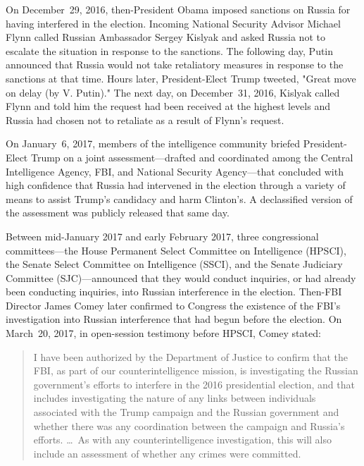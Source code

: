 On December~29, 2016, then-President Obama imposed sanctions on Russia for having interfered in the election.
Incoming National Security Advisor Michael Flynn called Russian Ambassador Sergey Kislyak and asked Russia not to escalate the situation in response to the sanctions.
The following day, Putin announced that Russia would not take retaliatory measures in response to the sanctions at that time.
Hours later, President-Elect Trump tweeted, "Great move on delay (by V. Putin)."
The next day, on December~31, 2016, Kislyak called Flynn and told him the request had been received at the highest levels and Russia had chosen not to retaliate as a result of Flynn's request.

\hr

On January~6, 2017, members of the intelligence community briefed President-Elect Trump on a joint assessment---drafted and coordinated among the Central Intelligence Agency, FBI, and National Security Agency---that concluded with high confidence that Russia had intervened in the election through a variety of means to assist Trump's candidacy and harm Clinton's.
A declassified version of the assessment was publicly released that same day.

Between mid-January 2017 and early February 2017, three congressional committees---the House Permanent Select Committee on Intelligence (HPSCI), the Senate Select Committee on Intelligence (SSCI), and the Senate Judiciary Committee (SJC)---announced that they would conduct inquiries, or had already been conducting inquiries, into Russian interference in the election.
Then-FBI Director James Comey later confirmed to Congress the existence of the FBI's investigation into Russian interference that had begun before the election.
On March~20, 2017, in open-session testimony before HPSCI, Comey stated:

\begin{quote}
I have been authorized by the Department of Justice to confirm that the FBI, as part of our counterintelligence mission, is investigating the Russian government's efforts to interfere in the 2016 presidential election, and that includes investigating the nature of any links between individuals associated with the Trump campaign and the Russian government and whether there was any coordination between the campaign and Russia's efforts.
\dots\ 
As with any counterintelligence investigation, this will also include an assessment of whether any crimes were committed.
\end{quote}

